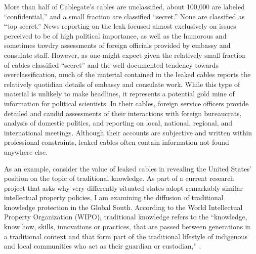 \documentclass[12pt]{article}
\begin{document}
More than half of Cablegate's cables are unclassified, about 100,000 are labeled ``confidential,'' 
and a small 
fraction are classified ``secret.'' None are classified as ``top secret.'' News reporting on the leak 
focused almost exclusively on issues perceived to be of high political importance, as well as 
the humorous and sometimes tawdry assessments of foreign officials provided by embassy and consulate 
staff. However, as one might expect given the relatively small fraction of cables classified ``secret'' 
and 
the well-documented tendency towards overclassification, much of the material 
contained in the leaked cables reports the relatively quotidian details of embassy and consulate 
work. 
While this type of material is unlikely to make headlines, it represents a potential gold mine 
of information for political scientists. In their cables, foreign service officers provide detailed 
and candid assessments of their interactions with foreign bureaucrats, analysis of domestic politics, 
and reporting on local, national, regional, and international meetings. Although their accounts are 
subjective and written within professional constraints, leaked cables often contain information 
not found anywhere else.

As an example, consider the value of leaked cables in revealing the United States' 
position on the topic of traditional knowledge. As part of a current research project that asks why 
very differently situated states 
adopt remarkably similar intellectual property policies, I am examining the diffusion of traditional 
knowledge protection in the Global South. According to the World Intellectual Property Organization 
(WIPO), traditional knowledge refers to the ``knowledge, know how, 
skills, innovations or practices, that are passed between generations in a traditional context and 
that form part of the traditional lifestyle of indigenous and local communities who act as their 
guardian or custodian,'' \citep{world_intellectual_property_organization2013traditional}.
\end{document}
